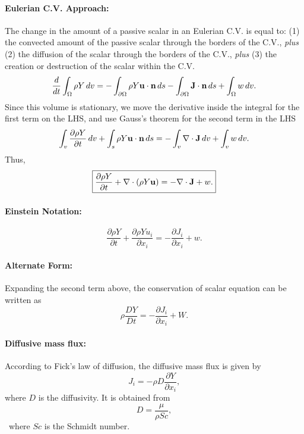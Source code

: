 \documentclass[oneside,a4paper,11pt]{report}
\begin{document}
\paragraph{Eulerian C.V. Approach:}
The change in the amount of a passive scalar in an Eulerian C.V. is equal to: (1) the convected amount of the passive scalar through the borders of the C.V., \textit{plus} (2) the diffusion of the scalar through the borders of the C.V., \textit{plus} (3) the creation or destruction of the scalar within the C.V. 
\begin{equation}
\frac{d}{dt}\int_\Omega \rho Y \,dv = -\int_{\partial \Omega} \rho Y \mathbf{u} \cdot \mathbf{n} \,ds - \int_{\partial \Omega} \mathbf{J} \cdot \mathbf{n} \, ds + \int_{\Omega} w \, dv.
\end{equation}
Since this volume is stationary, we move the derivative inside the integral for the first term on the LHS, and use Gauss's theorem for the second term in the LHS
\begin{equation}
\int_v \frac{\partial \rho Y}{\partial t}\,dv+\int_s \rho Y \mathbf{u} \cdot \mathbf{n} \,ds = -\int_v \nabla \cdot \mathbf{J} \, dv  + \int_v w \, dv.
\end{equation}
Thus,
\begin{equation}
\label{eq:scalar_conservation_vector}
\boxed{\frac{\partial \rho Y}{\partial t} + \nabla \cdot (\rho Y \mathbf{u}) = -\nabla \cdot \mathbf{J} + w .}
\end{equation}

\paragraph{Einstein Notation:}
\begin{equation}
\label{eq:scalar_conservation_tensor}
\boxed{\frac{\partial\rho Y}{\partial t}+\frac{\partial \rho Y u_i}{\partial x_i} = -\frac{\partial J_i}{\partial x_i} + w .}
\end{equation}

\paragraph{Alternate Form:}
Expanding the second term above, the conservation of scalar equation can be written as
\begin{equation}
\label{eq:scalar_conservation_noncons}
\rho \frac{DY}{Dt} =  -\frac{\partial J_i}{\partial x_i} + W.
\end{equation}

\paragraph{Diffusive mass flux:}
According to Fick's law of diffusion, the diffusive mass flux is given by
\begin{equation}
J_i = -\rho D \frac{\partial Y}{\partial x_i},
\end{equation}
where $D$ is the diffusivity. It is obtained from
\begin{equation}
D = \frac{\mu}{\rho Sc},
\end{equation}\
where $Sc$ is the Schmidt number.
\end{document}
